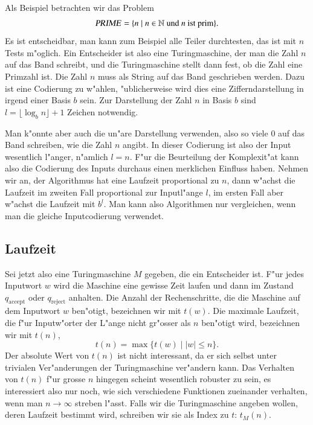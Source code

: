 Als Beispiel betrachten wir das Problem
\[
\text{\textsl{PRIME}}=\{ n\;|\; \text{$n\in\mathbb N$ und $n$ ist prim}\}.
\]
Es ist entscheidbar, man kann zum Beispiel alle Teiler durchtesten,
das ist mit $n$ Tests m"oglich. Ein Entscheider ist also eine Turingmaschine,
der man die Zahl $n$ auf das Band schreibt, und die Turingmaschine
stellt dann fest, ob die Zahl eine Primzahl ist. Die Zahl $n$ muss
als String auf das Band geschrieben werden. Dazu ist eine Codierung
zu w"ahlen, "ublicherweise wird dies eine Zifferndarstellung in
irgend einer Basis $b$ sein. Zur Darstellung der Zahl $n$ in Basis $b$
sind $l=\lfloor \log_bn\rfloor+1$ Zeichen notwendig.

Man k"onnte aber auch die un"are Darstellung verwenden, also so viele
$0$ auf das Band schreiben, wie die Zahl $n$ angibt. In dieser Codierung
ist also der Input wesentlich l"anger, n"amlich $l=n$.
F"ur die Beurteilung der
Komplexit"at kann also die Codierung des Inputs durchaus einen
merklichen Einfluss haben. Nehmen wir an, der Algorithmus hat
eine Laufzeit proportional zu $n$, dann w"achst die Laufzeit im
zweiten Fall proportional zur Inputl"ange $l$, im ersten Fall
aber w"achst die Laufzeit mit $b^l$. Man kann also Algorithmen
nur vergleichen, wenn man die gleiche Inputcodierung verwendet.

\subsection{Laufzeit}
Sei jetzt also eine Turingmaschine $M$ gegeben, die ein Entscheider
ist. F"ur jedes Inputwort $w$ wird die Maschine eine gewisse Zeit
laufen und dann im Zustand $q_{\text{accept}}$ oder $q_{\text{reject}}$
anhalten. Die Anzahl der Rechenschritte, die die Maschine auf dem
Inputwort $w$ ben"otigt, bezeichnen wir mit $t(w)$.
Die maximale Laufzeit, die f"ur Inputw"orter der L"ange nicht
gr"osser als $n$ ben"otigt wird, bezeichnen wir mit $t(n)$,
\[
t(n)=\max \{ t(w)\;|\; |w|\le n\}.
\]
Der absolute Wert von $t(n)$ ist nicht interessant, da er sich
selbst unter trivialen Ver"anderungen der Turingmaschine ver"andern
kann. Das Verhalten von $t(n)$ f"ur grosse $n$ hingegen scheint
wesentlich robuster zu sein, es interessiert also nur noch, wie
sich verschiedene Funktionen zueinander verhalten, wenn man $n\to\infty$
streben l"asst. Falls wir die Turingmaschine angeben wollen, deren
Laufzeit bestimmt wird, schreiben wir sie als Index zu $t$: $t_M(n)$.


